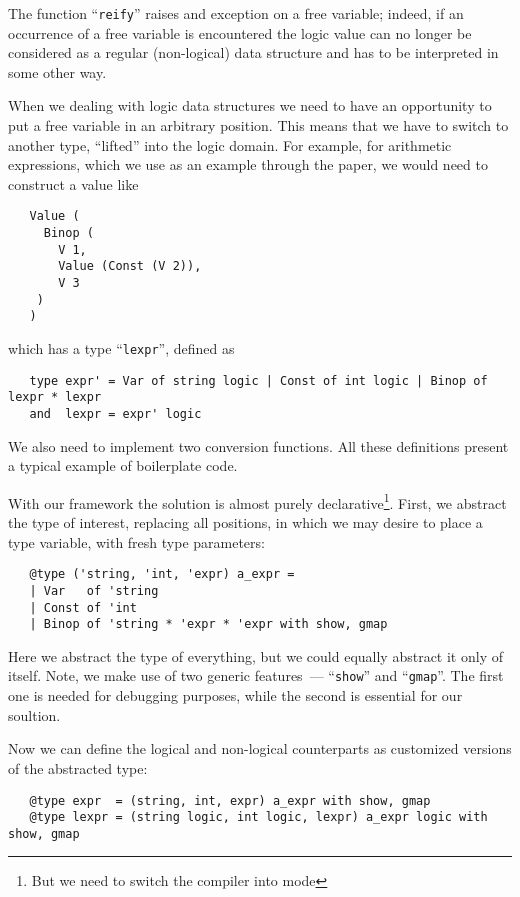 The function ``\lstinline{reify}'' raises and exception on a free variable; indeed, if an occurrence of a free variable
is encountered the logic value can no longer be considered as a regular (non-logical) data structure and has to be interpreted
in some other way.

When we dealing with logic data structures we need to have an opportunity to put a free variable in an arbitrary
position. This means that we have to switch to another type, ``lifted'' into the logic domain. For example,
for arithmetic expressions, which we use as an example through the paper, we would need to construct a value like

\begin{lstlisting}
   Value (
     Binop (
       V 1, 
       Value (Const (V 2)),
       V 3
    )
   )
\end{lstlisting}

which has a type ``\lstinline{lexpr}'', defined as

\begin{lstlisting}
   type expr' = Var of string logic | Const of int logic | Binop of lexpr * lexpr
   and  lexpr = expr' logic
\end{lstlisting}

We also need to implement two conversion functions. All these definitions present a typical example of boilerplate code.

With our framework the solution is almost purely declarative\footnote{But we need to switch the compiler into  mode}.
First, we abstract the type of interest, replacing all positions, in which we may desire to place a type variable, with
fresh type parameters:

\begin{lstlisting}
   @type ('string, 'int, 'expr) a_expr =
   | Var   of 'string
   | Const of 'int
   | Binop of 'string * 'expr * 'expr with show, gmap
\end{lstlisting}

Here we abstract the type of everything, but we could equally abstract it only of itself. Note, we make use of two
generic features~--- ``\lstinline{show}'' and ``\lstinline{gmap}''. The first one is needed for debugging purposes, while
the second is essential for our soultion.

Now we can define the logical and non-logical counterparts as customized versions of the abstracted type:

\begin{lstlisting}
   @type expr  = (string, int, expr) a_expr with show, gmap
   @type lexpr = (string logic, int logic, lexpr) a_expr logic with show, gmap
\end{lstlisting}

